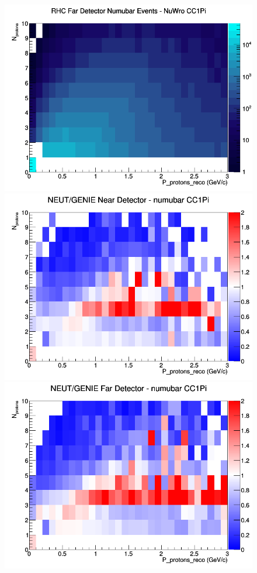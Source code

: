 \documentclass[12pt]{article}
\begin{document}
\begin{figure}[h]
\endminipage
{}
\includegraphics[width=\linewidth]{eff_N_P/LAr/protons/CC1Pi_RHC_FD_numubar_N_P_NuWro.png}
\endminipage
\newline
{}
\includegraphics[width=\linewidth]{eff_N_P/LAr/protons/ratios/CC1Pi_NEUT_GENIE_numubar_near_N_P.png}
\endminipage
{}
\includegraphics[width=\linewidth]{eff_N_P/LAr/protons/ratios/CC1Pi_NEUT_GENIE_numubar_far_N_P.png}

\end{figure}
\end{document}
